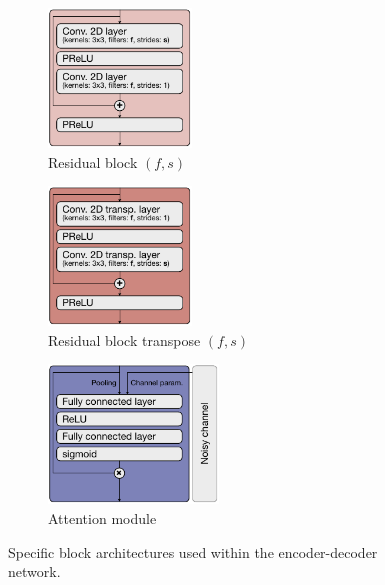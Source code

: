 \documentclass[conference]{IEEEtran}
\begin{document}
\begin{figure}
  \begin{subfigure}{.3\linewidth}
    \centering
    \includegraphics[height=10em]{figures/residual-block}
    \caption{Residual block $(f, s)$}
    \label{fig:residual}
  \end{subfigure}
  \hfill
  \begin{subfigure}{.3\linewidth}
    \centering
    \includegraphics[height=10em]{figures/residual-block-transpose}
    \caption{Residual block transpose $(f, s)$}
    \label{fig:residual-transpose}
  \end{subfigure}
  \hfill
  \begin{subfigure}{.3\linewidth}
    \centering
    \includegraphics[height=10em]{figures/attention-module}
    \caption{Attention module}
    \label{fig:attention}
  \end{subfigure}

  \caption{Specific block architectures used within the encoder-decoder network.}
  \label{fig:blocks}
\end{figure}
\end{document}
